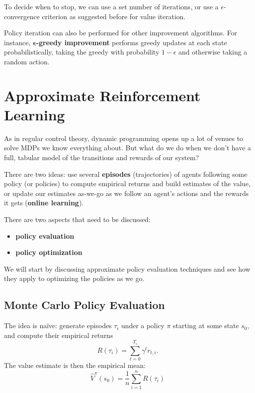 \documentclass[../course-notes.tex]{subfiles}
\begin{document}
To decide when to stop, we can use a set number of iterations, or use a $\epsilon$-convergence criterion as suggested before for value iteration.


Policy iteration can also be performed for other improvement algorithms. For instance, \textbf{$\boldsymbol\epsilon$-greedy improvement} performs greedy updates at each state probabilistically, taking the greedy with probability $1-\epsilon$ and otherwise taking a random action.




\chapter{Approximate Reinforcement Learning}\label{chap:ApproxRL}

As in regular control theory, dynamic programming opens up a lot of venues to solve MDPs we know everything about. But what do we do when we don't have a full, tabular model of the transitions and rewards of our system?

There are two ideas: use several \textbf{\bluefont episodes} (trajectories) of agents following some policy (or policies) to compute empirical returns and build estimates of the value, or update our estimates as-we-go as we follow an agent's actions and the rewards it gets (\textbf{\bluefont online learning}).


There are two aspects that need to be discussed:
\begin{itemize}
	\item \textbf{policy evaluation}
	\item \textbf{policy optimization}
\end{itemize}


We will start by discussing approximate policy evaluation techniques and see how they apply to optimizing the policies as we go.


\section{Monte Carlo Policy Evaluation}

The idea is naïve: generate episodes $\tau_i$ under a policy $\pi$ starting at some state $s_0$, and compute their empirical returns
\[
	R(\tau_i) = \sum_{t=0}^{T_i} \gamma^t r_{t,i}.
\]
The value estimate is then the empirical mean:
\begin{equation}
	\widehat{V}^\pi(s_0) = \frac{1}{n}\sum_{i=1}^{n} R(\tau_i)
\end{equation}
\end{document}
